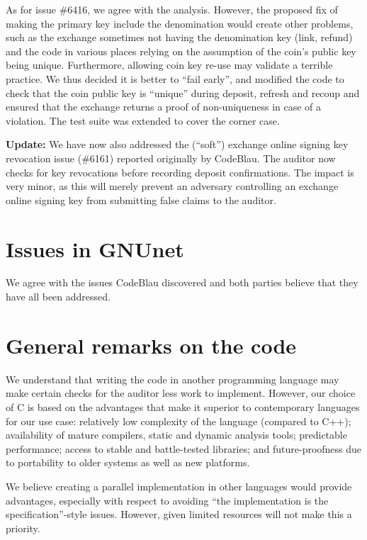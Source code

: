 \documentclass[11pt]{article}
\begin{document}
As for issue \#6416, we agree with the analysis. However, the proposed fix
of making the primary key include the denomination would create other problems,
such as the exchange sometimes not having the denomination key (link, refund)
and the code in various places relying on the assumption of the coin's
public key being unique. Furthermore, allowing coin key re-use may validate
a terrible practice. We thus decided it is better to ``fail early'', and
modified the code to check that the coin public key is ``unique'' during
deposit, refresh and recoup and ensured that the exchange returns a proof
of non-uniqueness in case of a violation. The test suite was extended to
cover the corner case.

{\bf Update:} We have now also addressed the (``soft'') exchange online
signing key revocation issue (\#6161) reported originally by CodeBlau.
The auditor now checks for key revocations before recording deposit
confirmations.  The impact is very minor, as this will merely prevent
an adversary controlling an exchange online signing key from submitting
false claims to the auditor.



\section{Issues in GNUnet}

We agree with the issues CodeBlau discovered and both parties believe that
they have all been addressed.

\section{General remarks on the code}

We understand that writing the code in another programming language may make
certain checks for the auditor less work to implement. However, our choice of C
is based on the advantages that make it superior to contemporary languages for
our use case:  relatively low complexity of the language (compared to C++);
availability of mature compilers, static and dynamic analysis tools;
predictable performance; access to stable and battle-tested libraries; and
future-proofness due to portability to older systems as well as new platforms.

We believe creating a parallel implementation in other languages would provide
advantages, especially with respect to avoiding ``the implementation is the
specification''-style issues.  However, given limited resources will not make
this a priority.
\end{document}
